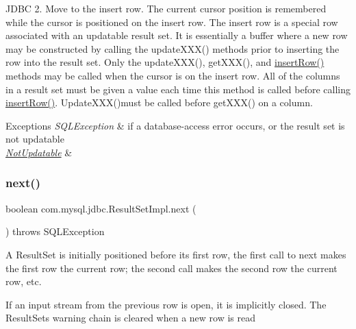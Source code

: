 J\+D\+BC 2. Move to the insert row. The current cursor position is remembered while the cursor is positioned on the insert row. The insert row is a special row associated with an updatable result set. It is essentially a buffer where a new row may be constructed by calling the update\+X\+X\+X() methods prior to inserting the row into the result set. Only the update\+X\+X\+X(), get\+X\+X\+X(), and \mbox{\hyperlink{classcom_1_1mysql_1_1jdbc_1_1_result_set_impl_a78e304e3279cbcf60392f18c1385e3bf}{insert\+Row()}} methods may be called when the cursor is on the insert row. All of the columns in a result set must be given a value each time this method is called before calling \mbox{\hyperlink{classcom_1_1mysql_1_1jdbc_1_1_result_set_impl_a78e304e3279cbcf60392f18c1385e3bf}{insert\+Row()}}. Update\+X\+X\+X()must be called before get\+X\+X\+X() on a column.


\begin{DoxyExceptions}{Exceptions}
{\em S\+Q\+L\+Exception} & if a database-\/access error occurs, or the result set is not updatable \\
\hline
{\em \mbox{\hyperlink{classcom_1_1mysql_1_1jdbc_1_1_not_updatable}{Not\+Updatable}}} & \\
\hline
\end{DoxyExceptions}
\mbox{\label{classcom_1_1mysql_1_1jdbc_1_1_result_set_impl_af9c00327ccf944cdcca7b610b69c5f26}} 
\subsubsection{\texorpdfstring{next()}{next()}}
{\footnotesize\ttfamily boolean com.\+mysql.\+jdbc.\+Result\+Set\+Impl.\+next (\begin{DoxyParamCaption}{ }\end{DoxyParamCaption}) throws S\+Q\+L\+Exception}

A Result\+Set is initially positioned before its first row, the first call to next makes the first row the current row; the second call makes the second row the current row, etc.

If an input stream from the previous row is open, it is implicitly closed. The Result\+Set\textquotesingle{}s warning chain is cleared when a new row is read 

